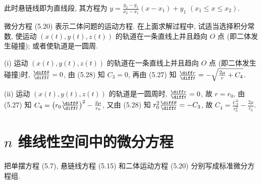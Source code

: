 \begin{solve} 
  此时悬链线即为直线段, 其方程为  $y=\frac{y_2-y_1}{x_2-x_1}(x-x_1)+y_1$ $(x_1\leq x\leq x_2)$.
\end{solve}



\begin{exercise}
  微分方程 (5.20) 表示二体问题的运动方程. 在上面求解过程中, 试适当选择积分常数, 
  使运动 $(x(t),y(t),z(t))$ 的轨道在一条直线上并且趋向 $O$ 点 (即二体发生碰撞); 或者使轨道是一圆周.
\end{exercise}

\begin{solve} 
  (i) 运动 $(x(t),y(t),z(t))$ 的轨道在一条直线上并且趋向 $O$ 点 (即二体发生碰撞)时, 
  $\frac{\diff\theta}{\diff t}=0$, 由 (5.28) 知 $C_3=0$, 再由 (5.27) 知
  $\frac{\diff r}{\diff t}=-\sqrt{\frac{2\mu}{r}+C_4}$.

  (ii) 运动 $(x(t),y(t),z(t))$ 的轨道是一圆周时, $\frac{\diff r}{\diff t}=0$, 
  故 $r=r_0$, 由 (5.27) 知 $C_4=\left(r_0\frac{\diff\theta}{\diff t}\right)^2-\frac{2\mu}{r_0}$, 
  又由 (5.28) 知 $r_0^2\frac{\diff\theta}{\diff t}=-C_3$, 
  故 $C_4=\frac{C_3^2}{r_0^2}-\frac{2\mu}{r_0}$.
\end{solve}



\section{$n$ 维线性空间中的微分方程}



\begin{exercise}
  把单摆方程 (5.7), 悬链线方程 (5.15) 和二体运动方程 (5.20) 分别写成标准微分方程组.
\end{exercise}

